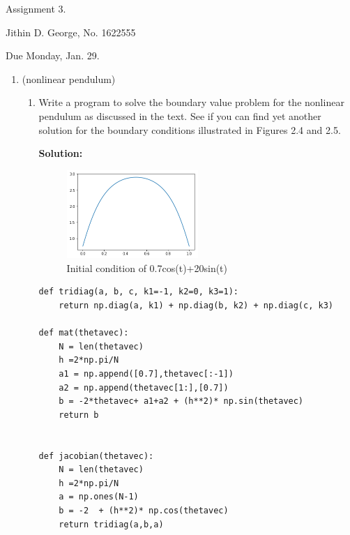 \documentclass[letterpaper,12pt]{article}
\begin{document}





\begin{center}
\large
Assignment 3.
\normalsize

Jithin D. George, No. 1622555
\end{center}

\noindent
Due Monday, Jan. 29.

\vspace{.5cm}

\begin{enumerate}
\item (nonlinear pendulum)
\begin{enumerate}
\item Write a program to solve the boundary value problem for the nonlinear pendulum 
as discussed in the text.  See if you can find yet another solution for the boundary
conditions illustrated in Figures 2.4 and 2.5.  


{\bf Solution:}

\begin{figure}[H]

\centering
\includegraphics[width=0.5\textwidth]{311.png}


\caption{Initial condition of 0.7cos(t)+20sin(t)}
\label{fig:figure3}

\end{figure}

	\begin{lstlisting}[style=MyPythonstyle]
def tridiag(a, b, c, k1=-1, k2=0, k3=1):
    return np.diag(a, k1) + np.diag(b, k2) + np.diag(c, k3)
    
def mat(thetavec):
    N = len(thetavec)
    h =2*np.pi/N
    a1 = np.append([0.7],thetavec[:-1])
    a2 = np.append(thetavec[1:],[0.7])
    b = -2*thetavec+ a1+a2 + (h**2)* np.sin(thetavec)
    return b


def jacobian(thetavec):
    N = len(thetavec)
    h =2*np.pi/N
    a = np.ones(N-1)
    b = -2  + (h**2)* np.cos(thetavec)
    return tridiag(a,b,a)  



\end{lstlisting}
\end{enumerate}
\end{enumerate}
\end{document}
